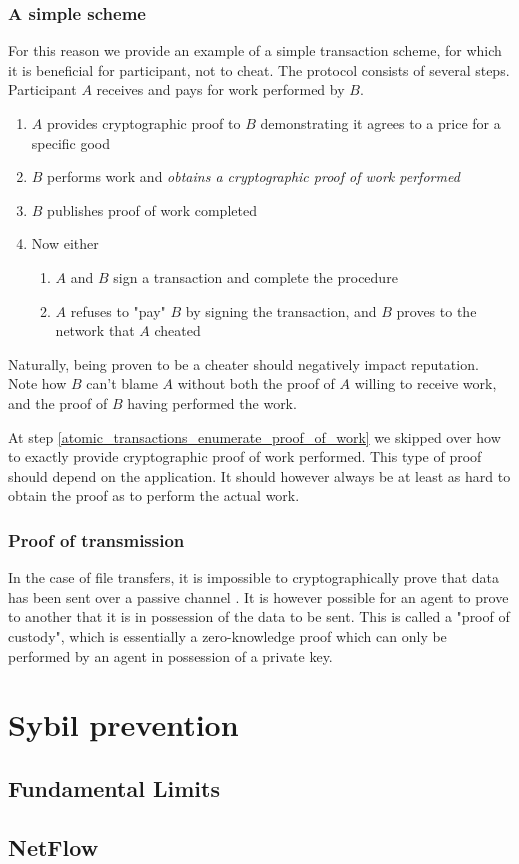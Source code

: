 \subsubsection{A simple scheme}
For this reason we provide an example of a simple transaction scheme, 
for which it is beneficial for participant, not to cheat. 
The protocol consists of several steps. 
Participant $A$ receives and pays for work performed by $B$.
\begin{enumerate}
	\item $A$ provides cryptographic proof to $B$ demonstrating it agrees to a price for a specific good
	\item \label{atomic_transactions_enumerate_proof_of_work}$B$ performs work and \emph{obtains a cryptographic proof of work performed}
	\item $B$ publishes proof of work completed
	\item Now either 
	\begin{enumerate}
		\item $A$ and $B$ sign a transaction and complete the procedure
		\item $A$ refuses to "pay" $B$ by signing the transaction, 
		and $B$ proves to the network that $A$ cheated
	\end{enumerate}
\end{enumerate}
Naturally, being proven to be a cheater should negatively impact reputation. 
Note how $B$ can't blame $A$ without both the proof of $A$ willing to receive work, 
and the proof of $B$ having performed the work.

At step \ref{atomic_transactions_enumerate_proof_of_work} we skipped over how to exactly provide cryptographic proof of work performed. 
This type of proof should depend on the application. 
It should however always be at least as hard to obtain the proof as to perform the actual work.

\subsubsection{Proof of transmission}\label{sssection:proof_of_transmission}
In the case of file transfers, 
it is impossible to cryptographically prove that data has been sent over a passive channel \cite{kravchenko}. 
It is however possible for an agent to prove to another that it is in possession of the data to be sent. 
This is called a "proof of custody", which is essentially a zero-knowledge proof which can only be performed by an agent in possession of a private key.

\section{Sybil prevention}
\subsection{Fundamental Limits}

\subsection{NetFlow}

